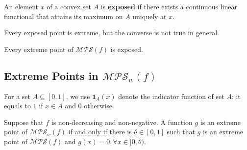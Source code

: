 \documentclass[11pt]{elegantbook}
\begin{document}
\begin{definition}
    \normalfont
    An element $x$ of a convex set $A$ is \textbf{exposed} if there exists a continuous linear functional that attains its maximum on $A$ uniquely at $x$.
\end{definition}
\begin{note}
    Every exposed point is extreme, but the converse is not true in general.
\end{note}

\begin{corollary}
    Every extreme point of $\mathcal{MPS}(f)$ is exposed.
\end{corollary}

\subsection{Extreme Points in $\mathcal{MPS}_w(f)$}
For a set $A\subseteq [0,1]$, we use $\mathbf{1}_{A}(x)$ denote the indicator function of set $A$: it equals to $1$ if $x\in A$ and $0$ otherwise.
\begin{corollary}
    Suppose that $f$ is non-decreasing and non-negative. A function $g$ is an extreme point of $\mathcal{MPS}_w(f)$ \underline{if and only if} there is $\theta \in[0,1]$ such that $g$ is an extreme point of $\mathcal{MPS}(f)$ and $g(x) = 0,\forall x\in[0,\theta)$.
\end{corollary}
\end{document}

